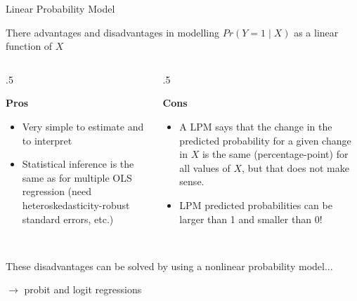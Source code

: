 \documentclass[notes,10pt, aspectratio=169]{beamer}
\begin{document}
\begin{frame}{Linear Probability Model}

There advantages and disadvantages in modelling $Pr(Y=1\mid X)$ as a linear function of $X$
\begin{columns} 
    \begin{column}{.5\textwidth}
        \begin{center}
            \textbf{Pros}
        \end{center}
        \begin{itemize}
            \item Very simple to estimate and to interpret
            \item Statistical inference is the same as for multiple OLS regression (need heteroskedasticity-robust standard errors, etc.)
        \end{itemize}
    \end{column}
    \begin{column}{.5\textwidth}
        \begin{center}
            \textbf{Cons}
        \end{center}
        \begin{itemize}
        \setcounter{enumi}{7}
            \item A LPM says that the change in the predicted probability for a given change in $X$ is the same (percentage-point) for all values of $X$, but that does not make sense.
            \item LPM predicted probabilities can be larger than 1 and smaller than 0!

        \end{itemize}

    \end{column}
\end{columns}\\[2em]

These disadvantages can be solved by using a nonlinear probability model...\\
\begin{center}
    $\longrightarrow$ probit and logit regressions
\end{center}
\end{frame}
\end{document}
